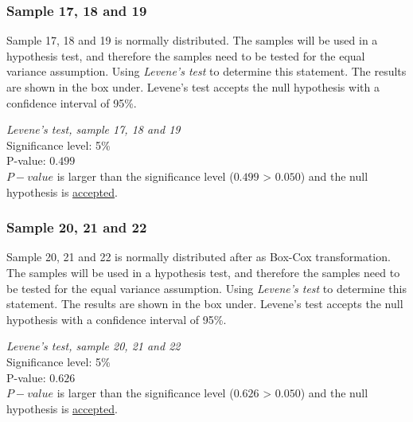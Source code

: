 \subsubsection{Sample 17, 18 and 19}\label{sec:sample17,18,19_levene}
Sample 17, 18 and 19 is normally distributed. The samples will be used in a hypothesis test, and therefore the samples need to be tested for the equal variance assumption. Using \textit{Levene's test} to determine this statement. The results are shown in the box under. Levene's test accepts the null hypothesis with a confidence interval of 95\%. \\[0.2cm]

\begin{center}
	\begin{tcolorbox}[width=0.8\textwidth]
		\centering
		\textit{Levene's test, sample 17, 18 and 19}\\
		Significance level: 5\%  \\[0.5cm]
		
		P-value: $0.499$\\[0.2cm]
		
		$P-value$ is larger than the significance level ($0.499$ > $0.050$) and the null hypothesis is \underline{accepted}.\\[0.5cm]
	\end{tcolorbox} 
\end{center}

\subsubsection{Sample 20, 21 and 22}\label{sec:sample20,21,22_levene}
Sample 20, 21 and 22 is normally distributed after as Box-Cox transformation. The samples will be used in a hypothesis test, and therefore the samples need to be tested for the equal variance assumption. Using \textit{Levene's test} to determine this statement. The results are shown in the box under. Levene's test accepts the null hypothesis with a confidence interval of 95\%. \\[0.2cm]

\begin{center}
	\begin{tcolorbox}[width=0.8\textwidth]
		\centering
		\textit{Levene's test, sample 20, 21 and 22}\\
		Significance level: 5\%  \\[0.5cm]
		
		P-value: $0.626$\\[0.2cm]
		
		$P-value$ is larger than the significance level ($0.626$ > $0.050$) and the null hypothesis is \underline{accepted}.\\[0.5cm]
	\end{tcolorbox} 
\end{center}

